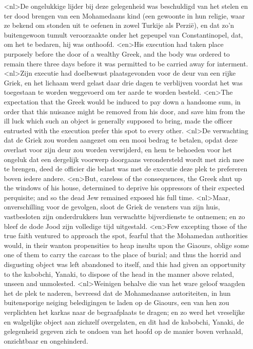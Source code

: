<nl>De ongelukkige lijder bij deze gelegenheid was beschuldigd van het stelen en ter dood brengen van een Mohamedaans kind (een gewoonte in hun religie, waar ze bekend om  stonden uit te oefenen in zowel Turkije als Perzië), en dat zo'n buitengewoon tumult veroorzaakte onder het gepeupel van Constantinopel, dat, om het  te bedaren, hij was onthoofd.
<en>His execution had taken place purposely before the door of a wealthy Greek, and the body was ordered to remain there three days before it was permitted to be carried away for interment.
<nl>Zijn executie had doelbewust plaatsgevonden voor de deur van een rijke Griek, en het lichaam werd gelast daar drie dagen te verblijven voordat het was toegestaan te worden weggevoerd om ter aarde te worden besteld.
<en>The expectation that the Greek would be induced to pay down a handsome sum, in order that this nuisance might be removed from his door, and save him from the ill luck which such an object is generally supposed to bring, made the officer entrusted with the execution prefer this spot to every other.
<nl>De verwachting dat de Griek zou worden aangezet om een mooi bedrag te betalen, opdat deze overlast voor zijn deur zou worden verwijderd, en hem te behoeden voor het ongeluk dat een dergelijk voorwerp doorgaans verondersteld wordt met zich mee te brengen, deed de officier die belast was met de executie deze plek te prefereren boven iedere andere.
<en>But, careless of the consequences, the Greek shut up the windows of his house, determined to deprive his oppressors of their expected perquisite; and so the dead Jew remained exposed his full time.
<nl>Maar, onverschilling voor de gevolgen, sloot de Griek de vensters van zijn huis, vastbesloten zijn onderdrukkers  hun verwachtte bijverdienste te ontnemen; en zo bleef de dode Jood zijn volledige tijd uitgestald.
<en>Few excepting those of the true faith ventured to approach the spot, fearful that the Mohamedan authorities would, in their wanton propensities to heap insults upon the Giaours, oblige some one of them to carry the carcass to the place of burial; and thus the horrid and disgusting object was left abandoned to itself, and this had given an opportunity to the kabobchi, Yanaki, to dispose of the head in the manner above related, unseen and unmolested.
<nl>Weinigen behalve die van het ware geloof waagden het de plek te naderen, bevreesd dat de Mohamedaanse autoriteiten, in hun buitensporige neiging  beledigingen te laden op de Giaours, een van hen zou verplichten het karkas naar de begraafplaats te dragen; en zo werd het vreselijke en walgelijke object aan zichzelf overgelaten, en dit had de kabobchi, Yanaki, de gelegenheid gegeven  zich te ondoen van het hoofd op de manier boven verhaald, onzichtbaar en ongehinderd.
